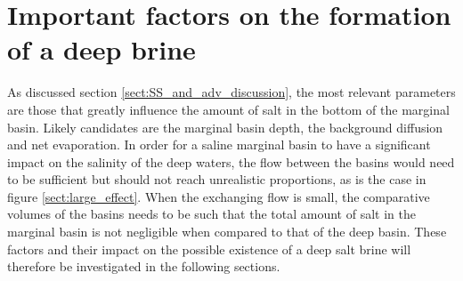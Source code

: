 \documentclass[twocolumn]{article}
\begin{document}
\FloatBarrier
\section{Important factors on the formation of a deep brine}
\label{sect:imprtant_parameters}
As discussed section \ref{sect:SS_and_adv_discussion}, the most relevant parameters are those that greatly influence the amount of salt in the bottom of the marginal basin. Likely candidates are the marginal basin depth, the background diffusion and net evaporation. In order for a saline marginal basin to have a significant impact on the salinity of the deep waters, the flow between the basins would need to be sufficient but should not reach unrealistic proportions, as is the case in figure \ref{sect:large_effect}. When the exchanging flow is small, the comparative volumes of the basins needs to be such that the total amount of salt in the marginal basin is not negligible when compared to that of the deep basin. These factors and their impact on the possible existence of a deep salt brine will therefore be investigated in the following sections.

\end{document}
